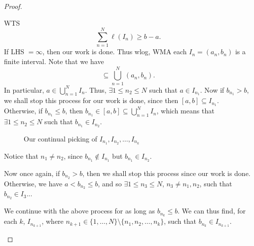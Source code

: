 \documentclass[notoc,notitlepage]{tufte-book}
\begin{document}
\begin{proof}
\begin{enumerate}
      WTS
      \begin{equation*}
        \sum_{n=1}^{N} \ell(I_n) \geq b - a.
      \end{equation*}
      If LHS $= \infty$, then our work is done. Thus wlog, WMA each $I_n = (a_n,
      b_n)$ is a finite interval. Note that we have
      \begin{equation*}
        [a, b] \subseteq \bigcup_{n=1}^{N} (a_n, b_n).
      \end{equation*}
      In particular, $a \in \bigcup_{n=1}^{N} I_n$. Thus, $\exists 1 \leq n_2
      \leq N$ such that $a \in I_{n_1}$. Now if $b_{n_1} > b$, we shall stop
      this process for our work is done, since then $[a, b] \subseteq I_{n_1}$.
      Otherwise, if $b_{n_1} \leq b$, then $b_{n_1} \in [a, b] \subseteq
      \bigcup_{n=1}^{N} I_n$, which means that $\exists 1 \leq n_2 \leq N$ such
      that $b_{n_1} \in I_{n_2}$.
      \begin{figure}[ht]
        \centering
        \caption{Our continual picking of $I_{n_1}, I_{n_2}, \ldots, I_{n_k}$}
        \label{fig:our_continual_picking_of_i__n_1_i__n_2_ldots_i__n_k_}
      \end{figure}
      Notice that $n_1 \neq n_2$, since $b_{n_1} \notin I_{n_1}$ but $b_{n_1}
      \in I_{n_2}$.

      Now once again, if $b_{n_2} > b$, then we shall stop this process since
      our work is done. Otherwise, we have $a < b_{n_2} \leq b$, and so $\exists
      1 \leq n_3 \leq N$, $n_3 \neq n_1, n_2$, such that $b_{n_2} \in I_3$...

      We continue with the above process for as long as $b_{n_k} \leq b$. We can
      thus find, for each $k$, $I_{n_{k+1}}$, where $n_{k+1} \in \{ 1, \ldots, N
      \} \setminus \{ n_1, n_2, \ldots, n_k \}$, such that $b_{n_k} \in
      I_{n_{k+1}}$.


\end{enumerate}
\end{proof}
\end{document}
